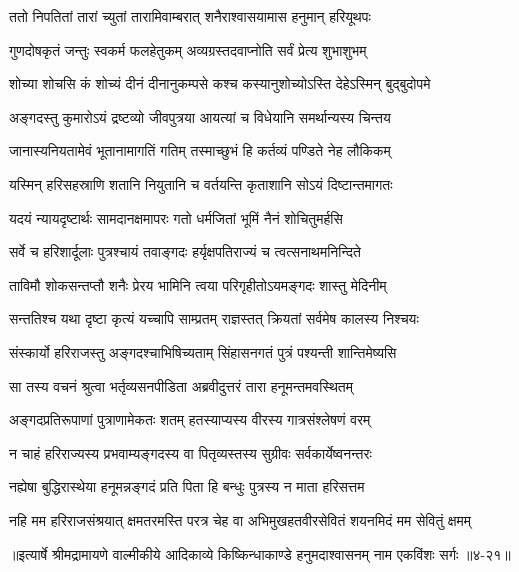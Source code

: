 
\twolineshloka
{ततो निपतितां तारां च्युतां तारामिवाम्बरात्}
{शनैराश्वासयामास हनुमान् हरियूथपः} %

\twolineshloka
{गुणदोषकृतं जन्तुः स्वकर्म फलहेतुकम्}
{अव्यग्रस्तदवाप्नोति सर्वं प्रेत्य शुभाशुभम्} %

\twolineshloka
{शोच्या शोचसि कं शोच्यं दीनं दीनानुकम्पसे}
{कश्च कस्यानुशोच्योऽस्ति देहेऽस्मिन् बुद्बुदोपमे} %

\twolineshloka
{अङ्गदस्तु कुमारोऽयं द्रष्टव्यो जीवपुत्रया}
{आयत्यां च विधेयानि समर्थान्यस्य चिन्तय} %

\twolineshloka
{जानास्यनियतामेवं भूतानामागतिं गतिम्}
{तस्माच्छुभं हि कर्तव्यं पण्डिते नेह लौकिकम्} %

\twolineshloka
{यस्मिन् हरिसहस्राणि शतानि नियुतानि च}
{वर्तयन्ति कृताशानि सोऽयं दिष्टान्तमागतः} %

\twolineshloka
{यदयं न्यायदृष्टार्थः सामदानक्षमापरः}
{गतो धर्मजितां भूमिं नैनं शोचितुमर्हसि} %

\twolineshloka
{सर्वे च हरिशार्दूलाः पुत्रश्चायं तवाङ्गदः}
{हर्यृक्षपतिराज्यं च त्वत्सनाथमनिन्दिते} %

\twolineshloka
{ताविमौ शोकसन्तप्तौ शनैः प्रेरय भामिनि}
{त्वया परिगृहीतोऽयमङ्गदः शास्तु मेदिनीम्} %

\twolineshloka
{सन्ततिश्च यथा दृष्टा कृत्यं यच्चापि साम्प्रतम्}
{राज्ञस्तत् क्रियतां सर्वमेष कालस्य निश्चयः} %

\twolineshloka
{संस्कार्यो हरिराजस्तु अङ्गदश्चाभिषिच्यताम्}
{सिंहासनगतं पुत्रं पश्यन्ती शान्तिमेष्यसि} %

\twolineshloka
{सा तस्य वचनं श्रुत्वा भर्तृव्यसनपीडिता}
{अब्रवीदुत्तरं तारा हनूमन्तमवस्थितम्} %

\twolineshloka
{अङ्गदप्रतिरूपाणां पुत्राणामेकतः शतम्}
{हतस्याप्यस्य वीरस्य गात्रसंश्लेषणं वरम्} %

\twolineshloka
{न चाहं हरिराज्यस्य प्रभवाम्यङ्गदस्य वा}
{पितृव्यस्तस्य सुग्रीवः सर्वकार्येष्वनन्तरः} %

\twolineshloka
{नह्येषा बुद्धिरास्थेया हनूमन्नङ्गदं प्रति}
{पिता हि बन्धुः पुत्रस्य न माता हरिसत्तम} %

\twolineshloka
{नहि मम हरिराजसंश्रयात् क्षमतरमस्ति परत्र चेह वा}
{अभिमुखहतवीरसेवितं शयनमिदं मम सेवितुं क्षमम्} %


॥इत्यार्षे श्रीमद्रामायणे वाल्मीकीये आदिकाव्ये किष्किन्धाकाण्डे हनुमदाश्वासनम् नाम एकविंशः सर्गः ॥४-२१॥
